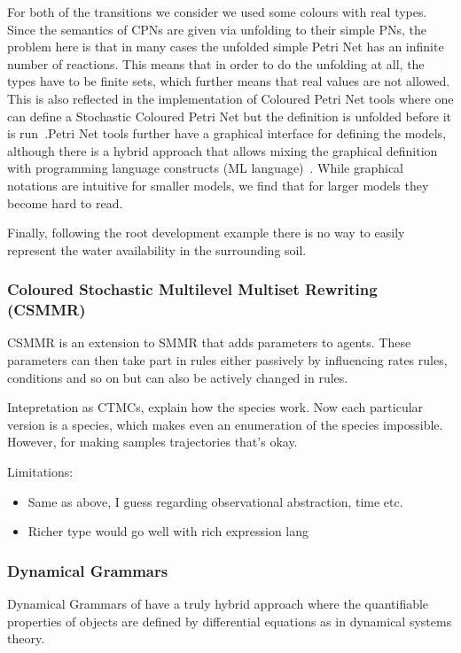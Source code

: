 \documentclass[phd]{infthesis}
\newcommand{\mr}[1]{\mathrm{#1}}
\begin{document}
For both of the transitions we consider we used some colours with $\mr{real}$
types. Since the semantics of CPNs are given via unfolding to their simple PNs,
the problem here is that in many cases the unfolded simple Petri Net has an
infinite number of reactions. This means that in order to do the unfolding at
all, the types have to be finite sets, which further means that real values are
not allowed. This is also reflected in the implementation of Coloured Petri Net
tools where one can define a Stochastic Coloured Petri Net but the definition is
unfolded before it is run~\citep{heiner_snoopyunifying_2012}.Petri Net tools
further have a graphical interface for defining the models, although there is a
hybrid approach that allows mixing the graphical definition with programming
language constructs (ML language)~\cite{jensen_coloured_1987}. While graphical
notations are intuitive for smaller models, we find that for larger models
they become hard to read.

Finally, following the root development example there is no way to easily
represent the water availability in the surrounding soil.


\subsubsection*{Coloured Stochastic Multilevel Multiset Rewriting (CSMMR)}
CSMMR is an extension to SMMR that adds parameters to agents. These
parameters can then take part in rules either passively by influencing rates
rules, conditions and so on but can also be actively changed in rules.

Intepretation as CTMCs, explain how the species work. Now each particular
version is a species, which makes even an enumeration of the species
impossible. However, for making samples trajectories that's okay.

Limitations:
\begin{itemize}
\item Same as above, I guess regarding observational abstraction, time etc.
\item Richer type would go well with rich expression lang
\end{itemize}

\subsubsection*{Dynamical Grammars}
Dynamical Grammars of \citet{mjolsness2006stochastic} have a truly hybrid
approach where the quantifiable properties of objects are defined by
differential equations as in dynamical systems theory.
\end{document}
